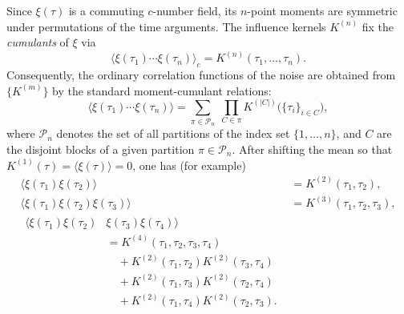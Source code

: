 Since $\xi(\tau)$ is a commuting $c$-number field, its $n$-point moments are symmetric under
permutations of the time arguments. The influence kernels $K^{(n)}$ fix the \emph{cumulants} of
$\xi$ via
\begin{equation}
\big\langle \xi(\tau_1)\cdots \xi(\tau_n)\big\rangle_c
=
K^{(n)}(\tau_1,\ldots,\tau_n).
\label{eq:xi_cumulants_equal_K}
\end{equation}
Consequently, the ordinary correlation functions of the noise are obtained from
$\{K^{(m)}\}$ by the standard moment-cumulant relations:
\begin{equation}
\big\langle \xi(\tau_1)\cdots \xi(\tau_n)\big\rangle
=
\sum_{\pi\in\mathcal P_n}\;
\prod_{C\in\pi}
K^{(|C|)}\!\big(\{\tau_i\}_{i\in C}\big),
\label{eq:moment_cumulant_partition}
\end{equation}
where $\mathcal P_n$ denotes the set of all partitions of the index set $\{1,\ldots,n\}$, and $C$ are the disjoint blocks of a given partition $\pi \in \mathcal P_n$. After shifting the mean so that $K^{(1)}(\tau)=\langle\xi(\tau)\rangle=0$, one has (for example)
\begin{align}
\big\langle \xi(\tau_1)\xi(\tau_2)\big\rangle
&= K^{(2)}(\tau_1,\tau_2),\\
\big\langle \xi(\tau_1)\xi(\tau_2)\xi(\tau_3)\big\rangle
&= K^{(3)}(\tau_1,\tau_2,\tau_3),\\
\begin{split}
\big\langle \xi(\tau_1)\xi(\tau_2)&\xi(\tau_3)\xi(\tau_4)\big\rangle \\
&= K^{(4)}(\tau_1,\tau_2,\tau_3,\tau_4) \\
& \quad + K^{(2)}(\tau_1,\tau_2)K^{(2)}(\tau_3,\tau_4) \\
& \quad + K^{(2)}(\tau_1,\tau_3)K^{(2)}(\tau_2,\tau_4) \\
& \quad + K^{(2)}(\tau_1,\tau_4)K^{(2)}(\tau_2,\tau_3).
\end{split}
\end{align}


